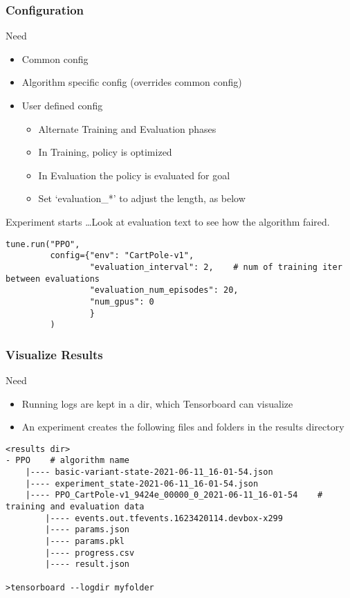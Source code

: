 \begin{frame}[fragile]\frametitle{Configuration}
Need 
\begin{itemize}
\item Common config
\item Algorithm specific config (overrides common config)
\item User defined config
	\begin{itemize}
	\item Alternate Training and Evaluation phases
	\item In Training, policy is optimized
	\item In Evaluation the policy is evaluated for goal
	\item Set `evaluation\_*' to adjust the length, as below
	\end{itemize}
\end{itemize}

Experiment starts \ldots Look at evaluation text to see how the algorithm faired.


\begin{lstlisting}
tune.run("PPO",
         config={"env": "CartPole-v1",
                 "evaluation_interval": 2,    # num of training iter between evaluations
                 "evaluation_num_episodes": 20,
                 "num_gpus": 0
                 }
         )
\end{lstlisting}


\end{frame}

\begin{frame}[fragile]\frametitle{Visualize Results}
Need 
\begin{itemize}
\item Running logs are kept in a dir, which Tensorboard can visualize
\item An experiment creates the following files and folders in the results directory
\end{itemize}

\begin{lstlisting}
<results dir>
- PPO    # algorithm name
    |---- basic-variant-state-2021-06-11_16-01-54.json
    |---- experiment_state-2021-06-11_16-01-54.json
    |---- PPO_CartPole-v1_9424e_00000_0_2021-06-11_16-01-54    # training and evaluation data
        |---- events.out.tfevents.1623420114.devbox-x299
        |---- params.json
        |---- params.pkl
        |---- progress.csv
        |---- result.json
				
>tensorboard --logdir myfolder						
\end{lstlisting}


\end{frame}

